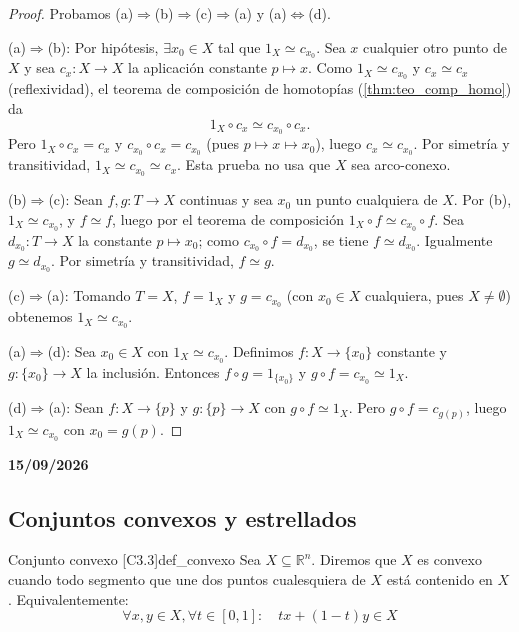 \begin{proof}
Probamos (a)$\Rightarrow$(b)$\Rightarrow$(c)$\Rightarrow$(a) y (a)$\Leftrightarrow$(d).

(a)$\Rightarrow$(b): Por hipótesis, $\exists x_0 \in X$ tal que $1_X \simeq c_{x_0}$. Sea $x$ cualquier otro punto de $X$ y sea $c_x \colon X \to X$ la aplicación constante $p \mapsto x$. Como $1_X \simeq c_{x_0}$ y $c_x \simeq c_x$ (reflexividad), el teorema de composición de homotopías (\cref{thm:teo_comp_homo}) da
\[ 1_X \circ c_x \simeq c_{x_0} \circ c_x. \]
Pero $1_X \circ c_x = c_x$ y $c_{x_0} \circ c_x = c_{x_0}$ (pues $p \mapsto x \mapsto x_0$), luego $c_x \simeq c_{x_0}$. Por simetría y transitividad, $1_X \simeq c_{x_0} \simeq c_x$. Esta prueba no usa que $X$ sea arco-conexo.

(b)$\Rightarrow$(c): Sean $f, g \colon T \to X$ continuas y sea $x_0$ un punto cualquiera de $X$. Por (b), $1_X \simeq c_{x_0}$, y $f \simeq f$, luego por el teorema de composición $1_X \circ f \simeq c_{x_0} \circ f$. Sea $d_{x_0} \colon T \to X$ la constante $p \mapsto x_0$; como $c_{x_0} \circ f = d_{x_0}$, se tiene $f \simeq d_{x_0}$. Igualmente $g \simeq d_{x_0}$. Por simetría y transitividad, $f \simeq g$.

(c)$\Rightarrow$(a): Tomando $T = X$, $f = 1_X$ y $g = c_{x_0}$ (con $x_0 \in X$ cualquiera, pues $X \neq \emptyset$) obtenemos $1_X \simeq c_{x_0}$.

(a)$\Rightarrow$(d): Sea $x_0 \in X$ con $1_X \simeq c_{x_0}$. Definimos $f \colon X \to \{x_0\}$ constante y $g \colon \{x_0\} \to X$ la inclusión. Entonces $f \circ g = 1_{\{x_0\}}$ y $g \circ f = c_{x_0} \simeq 1_X$.

(d)$\Rightarrow$(a): Sean $f \colon X \to \{p\}$ y $g \colon \{p\} \to X$ con $g \circ f \simeq 1_X$. Pero $g \circ f = c_{g(p)}$, luego $1_X \simeq c_{x_0}$ con $x_0 = g(p)$.
\end{proof}

\textbf{15/09/2026}

\subsection{Conjuntos convexos y estrellados}

\begin{definicion}{Conjunto convexo [C3.3]}{def_convexo}
Sea $X \subseteq \mathbb{R}^n$. Diremos que $X$ es convexo cuando todo segmento que une dos puntos cualesquiera de $X$ está contenido en $X$. Equivalentemente:
\[ \forall x,y \in X, \forall t \in [0,1]: \quad tx + (1-t)y \in X \]
\end{definicion}

